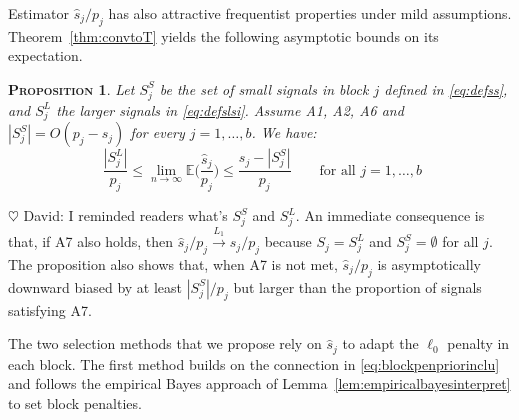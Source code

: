 \documentclass[aos]{imsart}
\theoremstyle{plain}
\newtheorem{prop}{\textsc{Proposition}}[section]
\newcommand{\david}[1]{{\small{\color{blue} \sf $\heartsuit$ David: #1}}}
\newcommand{\E}{\mathbb{E}}
\newcommand{\bs}{\boldsymbol}
\begin{document}
Estimator $\widehat{s}_j/p_j$ has also attractive frequentist properties under mild assumptions. Theorem~\ref{thm:convtoT} yields the following asymptotic bounds on its expectation.
\begin{prop}
    \label{lem:shatconsistence}
Let $S^S_j$ be the set of small signals in block $j$ defined in \eqref{eq:defss}, and $S^L_j$ the larger signals in \eqref{eq:defslsi}.
Assume A1, A2, A6 and $|S^S_j|=O(p_j-s_j)$ for every $j=1,\ldots,b$. We have:$$ \,\, \frac{|S^L_j|}{p_j}\leq \lim_{n\to\infty}\E\bigg(\frac{\widehat{s}_j}{p_j}\bigg)\leq \frac{s_j-|S^S_j|}{p_j}\qquad\text{for all }j=1,\ldots,b$$
\end{prop}
\david{I reminded readers what's $S_j^S$ and $S_j^L$.}
An immediate consequence is that, if A7 also holds, then $\widehat{s}_j/p_j \stackrel{L_1}{\longrightarrow} s_j/p_j$ %
because $S_j=S_j^L$ and $S_j^S=\emptyset$ for all $j$. The proposition also shows that, when A7 is not met, $\widehat{s}_j/p_j$ is asymptotically downward biased by at least $|S^S_j|/p_j$ but larger than the proportion of signals satisfying A7. 

The two selection methods that we propose rely on $\widehat{s}_j$ to adapt the $\ell_0$ penalty in each block. The first method builds on the connection in \eqref{eq:blockpenpriorinclu} and follows the empirical Bayes approach of Lemma~\ref{lem:empiricalbayesinterpret} to set block penalties.\\ \\
\end{document}
